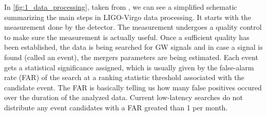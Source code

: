 In \autoref{fig:1_data_processing}, taken from \cite{2020CQGra..37e5002A},
we can see a simplified schematic summarizing the main steps in LIGO-Virgo data
processing.  It starts with the measurement done by the detector. The
measurement undergoes a quality control to make sure the measurement is actually
useful. Once a sufficient quality has been established, the data is being
searched for GW signals and in case a signal is found (called an event),
the mergers parameters are being estimated. Each event gets a statistical
significance assigned, which is usually given by the false-alarm rate (FAR)
of the search at a ranking statistic threshold associated with the candidate 
event. The FAR is basically telling us how many false positives occured over
the duration of the analyzed data. Current low-latency searches do not distribute
any event candidates with a FAR greated than 1 per month.





%






